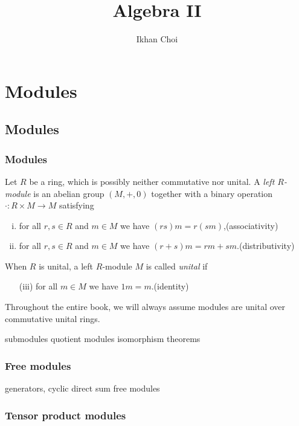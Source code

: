 \documentclass{../../large}
\begin{document}
\title{Algebra II}
\author{Ikhan Choi}
\maketitle
\tableofcontents

\part{Modules}



\chapter{Modules}
\section{Modules}

\begin{prb}
Let $R$ be a ring, which is possibly neither commutative nor unital.
A \emph{left $R$-module} is an abelian group $(M,+,0)$ together with a binary operation $\cdot:R\times M\to M$ satisfying
\begin{enumerate}[(i)]
\item for all $r,s\in R$ and $m\in M$ we have $(rs)m=r(sm)$,\hfill(associativity)
\item for all $r,s\in R$ and $m\in M$ we have $(r+s)m=rm+sm$.\hfill(distributivity)
\end{enumerate}
When $R$ is unital, a left $R$-module $M$ is called \emph{unital} if
\begin{enumerate}
\item[(iii)] for all $m\in M$ we have $1m=m$.\hfill(identity)
\end{enumerate}
Throughout the entire book, we will always assume modules are unital over commutative unital rings.
\begin{parts}
\item
\end{parts}
\end{prb}

submodules
quotient modules
isomorphism theorems



\section{Free modules}
generators, cyclic
direct sum
free modules

\section{Tensor product modules}
\end{document}
